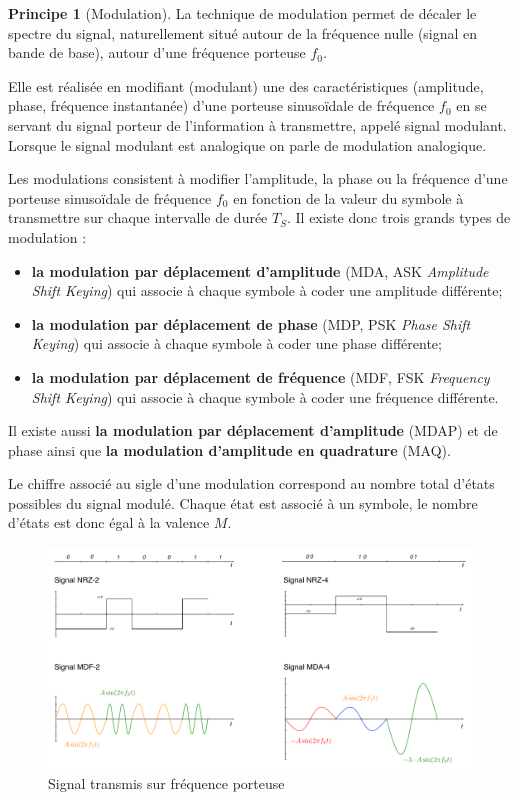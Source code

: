 \documentclass[11pt,english,french]{scrreprt}
\theoremstyle{remark}
\theoremstyle{definition}
\newtheorem*{princ*}{Principe}
\begin{document}
\begin{princ*}[Modulation]
La technique de modulation permet de décaler le spectre du signal, naturellement situé autour de la fréquence nulle (signal en bande de base), autour d'une fréquence porteuse $f_0$. 

Elle est réalisée en modifiant (modulant) une des caractéristiques (amplitude, phase, fréquence instantanée) d'une porteuse sinusoïdale de fréquence $f_0$ en se servant du signal porteur de l'information à transmettre, appelé signal modulant. Lorsque le signal modulant est analogique on parle de modulation analogique.
\end{princ*}

Les modulations consistent à modifier l'amplitude, la phase ou la fréquence d'une porteuse sinusoïdale de fréquence $f_0$ en fonction de la valeur du symbole à transmettre sur chaque intervalle de durée $T_S$. Il existe donc trois grands types de modulation :\begin{itemize}
	\item \textbf{la modulation par déplacement d'amplitude} (MDA, ASK \emph{Amplitude Shift Keying}) qui associe à chaque symbole à coder une amplitude différente;
	\item \textbf{la modulation par déplacement de phase} (MDP, PSK \emph{Phase Shift Keying}) qui associe à chaque symbole à coder une phase différente;
	\item \textbf{la modulation par déplacement de fréquence} (MDF, FSK \emph{Frequency Shift Keying}) qui associe à chaque symbole à coder une fréquence différente.
\end{itemize}

Il existe aussi \textbf{la modulation par déplacement d'amplitude} (MDAP) et de phase ainsi que \textbf{la modulation d'amplitude en quadrature} (MAQ).

Le chiffre associé au sigle d'une modulation correspond au nombre total d'états possibles du signal modulé. Chaque état est associé à un symbole, le nombre d'états est donc égal à la valence $M$.

\begin{figure}[h!]
	\center
	\includegraphics[scale=.7]{graphes/signals}
	\caption{Signal transmis sur fréquence porteuse}
\end{figure}
\end{document}
